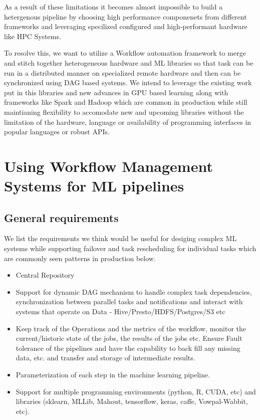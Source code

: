 \documentclass[10pt,onecolumn]{IEEEtran}
\begin{document}
As a result of these limitations it becomes almost impossible to build a hetergenous pipeline by choosing high performance componenets from different frameworks and leveraging specilized configured and high-performant hardware like HPC Systems.

To resolve this, we want to utilize a Workflow automation framework to merge and stitch together heterogeneous hardware and ML libraries so that task can be run in a distributed manner on specialized remote hardware and then can be synchronized using DAG based systems. We intend to leverage the existing work put in this libraries and new advances in GPU based learning along with frameworks like Spark and Hadoop which are common in production while still maintianing flexibility to accomodate new and upcoming libraries without the limitation of the hardware, language or availability of programming interfaces in popular languages or robust APIs.


\section{Using Workflow Management Systems for ML pipelines}
\subsection{General requirements}
We list the requirements we think would be useful for desiging complex ML systems while supporting failover and task rescheduling for individual tasks which are commonly seen patterns in production below.
\begin{itemize}
\item Central Repository
\item Support for dynamic DAG mechanism to handle complex task dependencies, synchronization between parallel tasks and notifications and interact with systems that operate on Data - Hive/Presto/HDFS/Postgres/S3 etc
\item Keep track of the Operations and the metrics of the workflow, monitor the current/historic state of the jobs, the results of the jobs etc. Ensure Fault tolerance of the pipelines and have the capability to back fill any missing data, etc. and transfer and storage of intermediate results.
\item Parameterization of each step in the machine learning pipeline.
\item Support for multiple programming environments (python, R, CUDA, etc) and libraries (sklearn, MLLib, Mahout, tensorflow, keras, caffe, Vowpal-Wabbit, etc).
\end{itemize}
\end{document}
